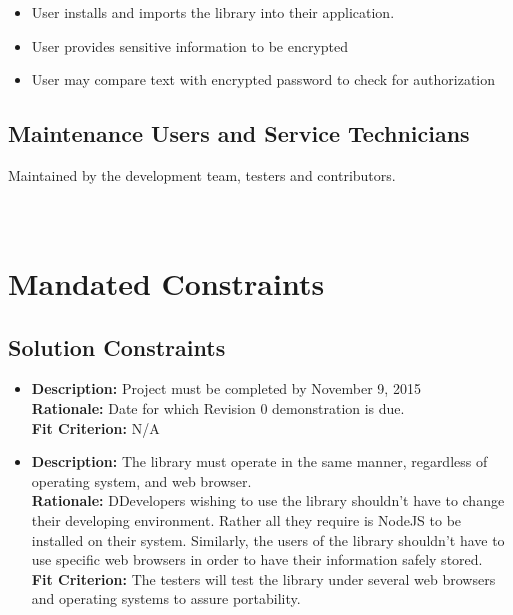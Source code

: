 \documentclass[12pt]{article}
\begin{document}
	\begin{itemize}
		\item User installs and imports the library into their application.
		\item User provides sensitive information to be encrypted 
		\item User may compare text with encrypted password to check for authorization
	\end{itemize}


\subsection{Maintenance Users and Service Technicians}
Maintained by the development team, testers and contributors. \\ \\ \\

\section*{}
\section{Mandated Constraints}
\subsection{Solution Constraints}
\begin{itemize}	

	\item	\textbf{Description:} Project must be completed by November 9, 2015 \\
		\textbf{Rationale:} Date for which Revision 0 demonstration is due. \\
		\textbf{Fit Criterion:} N/A 

	
	\item	\textbf{Description:} The library must operate in the same manner, regardless of operating system, and web   browser. \\
		\textbf{Rationale:} DDevelopers wishing to use the library shouldn’t have to change their developing environment. Rather all they require is NodeJS to be installed on their system. Similarly, the users of the library shouldn’t have to use specific web browsers in order to have their information safely stored.\\
		\textbf{Fit Criterion:} The testers will test the library under several web browsers and operating systems to assure portability.\\
\end{itemize}
\end{document}
